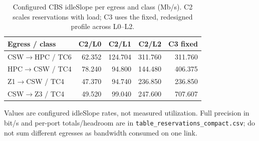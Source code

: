 \begin{table}[t]
\centering
\caption{Configured CBS idleSlope per egress and class (Mb/s). C2 scales reservations with load; C3 uses the fixed, redesigned profile across L0--L2.}
\label{tab:compact-reservations}
\footnotesize
\setlength{\tabcolsep}{3pt}
\begin{tabular}{@{}lrrrr@{}}
\toprule
Egress / class & C2/L0 & C2/L1 & C2/L2 & C3 fixed \\
\midrule
CSW$\rightarrow$HPC / TC6 & 62.352 & 124.704 & 311.760 & 311.760 \\
HPC$\rightarrow$CSW / TC4 & 78.240 & 94.800 & 144.480 & 406.375 \\
Z1$\rightarrow$CSW / TC4 & 47.370 & 94.740 & 236.850 & 236.850 \\
CSW$\rightarrow$Z3 / TC4 & 49.520 & 99.040 & 247.600 & 707.607 \\
\bottomrule
\end{tabular}
\par\vspace{2pt}
\begin{minipage}{\columnwidth}\footnotesize
Values are configured idleSlope rates, not measured utilization. Full precision in bit/s and per-port totals/headroom are in \texttt{table\_reservations\_compact.csv}; do not sum different egresses as bandwidth consumed on one link.
\end{minipage}
\end{table}
